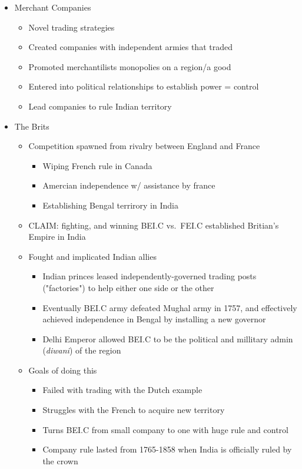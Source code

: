 \documentclass[letterpaper]{article}
\begin{document}
\begin{itemize}
\item Merchant Companies

\begin{itemize}
\item Novel trading strategies
\item Created companies with independent armies that traded
\item Promoted merchantilists monopolies on a region/a good
\item Entered into political relationships to establish power = control
\item Lead companies to rule Indian territory
\end{itemize}

\item The Brits

\begin{itemize}
\item Competition spawned from rivalry between England and France

\begin{itemize}
\item Wiping French rule in Canada
\item Amercian independence w/ assistance by france
\item Establishing Bengal terrirory in India
\end{itemize}

\item CLAIM: fighting, and winning BEI.C vs. FEI.C established Britian's
Empire in India
\item Fought and implicated Indian allies

\begin{itemize}
\item Indian princes leased independently-governed trading posts
("factories") to help either one side or the other
\item Eventually BEI.C army defeated Mughal army in 1757, and
effectively achieved independence in Bengal by installing a new
governor
\item Delhi Emperor allowed BEI.C to be the political and millitary
admin (\emph{diwani}) of the region
\end{itemize}

\item Goals of doing this

\begin{itemize}
\item Failed with trading with the Dutch example
\item Struggles with the French to acquire new territory
\item Turns BEI.C from small company to one with huge rule and control
\item Company rule lasted from 1765-1858 when India is officially ruled
by the crown
\end{itemize}


\end{itemize}
\end{itemize}
\end{document}
